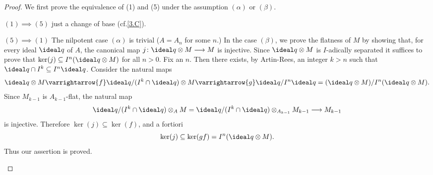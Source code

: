 \documentclass[../main]{subfiles}
\begin{document}
\begin{proof}
We first prove the equivalence of (1) and (5) under the assumption $(\alpha)$ or $(\beta)$. 
\begin{implyenumerate}
    \item[$(1)\implies (5)$] just a change of base (cf.\ref{3.C}).
    \item[$(5)\implies (1)$] The nilpotent case $(\alpha)$ is trivial ($A = A_n$ for some $n$.) In the case $(\beta)$, we prove the flatness of $M$ by showing that, for every ideal $\ideal q$ of $A$, the canonical map $j\colon \ideal q \otimes M\longrightarrow M$ is injective. Since $\ideal q \otimes M$ is $I$-adically separated it suffices to prove that $\ker(j)\subseteq I^n(\ideal q\otimes M)$ for all $n>0$. Fix an $n$. Then there exists, by Artin-Rees, an integer $k>n$ such that $\ideal q \cap I^k \subseteq I^n\ideal q$. Consider the natural maps \[\ideal q \otimes M \varrightarrow{f} \ideal q/(I^k\cap \ideal q)\otimes M\varrightarrow{g} \ideal q/I^n\ideal q = (\ideal q \otimes M)/I^n(\ideal q\otimes M).\]
    Since $M_{k-1}$ is $A_{k-1}$-flat, the natural map \[\ideal q/(I^k\cap \ideal q)\otimes_A M = \ideal q/(I^k\cap \ideal q)\otimes_{A_{k-1}} M_{k-1}\longrightarrow M_{k-1}\] 
    is injective. Therefore $\ker(j)\subseteq \ker(f)$, and a fortiori \[\ker(j)\subseteq \ker(gf) = I^n(\ideal q\otimes M).\] Thus our assertion is proved.
\end{implyenumerate}


\end{proof}
\end{document}
